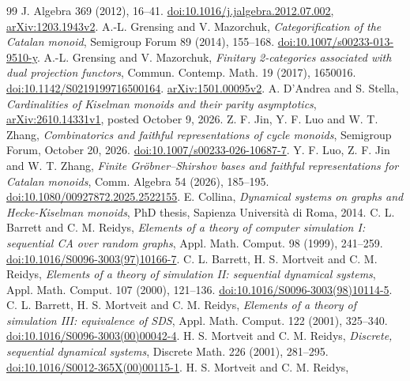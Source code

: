 \documentclass[11pt]{article}
\begin{document}
\begin{thebibliography}{99}
J. Algebra 369 (2012), 16--41.
\href{https://doi.org/10.1016/j.jalgebra.2012.07.002}{doi:10.1016/j.jalgebra.2012.07.002},
\href{https://arxiv.org/abs/1203.1943v2}{arXiv:1203.1943v2}.
 A.-L. Grensing and V. Mazorchuk,
\emph{Categorification of the Catalan monoid},
Semigroup Forum 89 (2014), 155--168.
\href{https://doi.org/10.1007/s00233-013-9510-y}{doi:10.1007/s00233-013-9510-y}.
 A.-L. Grensing and V. Mazorchuk,
\emph{Finitary 2-categories associated with dual projection functors},
Commun. Contemp. Math. 19 (2017), 1650016.
\href{https://doi.org/10.1142/S0219199716500164}{doi:10.1142/S0219199716500164}.
\href{https://arxiv.org/abs/1501.00095v2}{arXiv:1501.00095v2}.
 A. D'Andrea and S. Stella,
\emph{Cardinalities of Kiselman monoids and their parity asymptotics},
\href{https://arxiv.org/abs/2610.14331v1}{arXiv:2610.14331v1}, posted October 9, 2026.
 Z. F. Jin, Y. F. Luo and W. T. Zhang,
\emph{Combinatorics and faithful representations of cycle monoids},
Semigroup Forum, October 20, 2026.
\href{https://doi.org/10.1007/s00233-026-10687-7}{doi:10.1007/s00233-026-10687-7}.
 Y. F. Luo, Z. F. Jin and W. T. Zhang,
\emph{Finite Gr\"obner--Shirshov bases and faithful representations for Catalan monoids},
Comm. Algebra 54 (2026), 185--195.
\href{https://doi.org/10.1080/00927872.2025.2522155}{doi:10.1080/00927872.2025.2522155}.
 E. Collina,
\emph{Dynamical systems on graphs and Hecke-Kiselman monoids},
PhD thesis, Sapienza Universit\`a di Roma, 2014.
 C. L. Barrett and C. M. Reidys,
\emph{Elements of a theory of computer simulation I: sequential CA over random graphs},
Appl. Math. Comput. 98 (1999), 241--259.
\href{https://doi.org/10.1016/S0096-3003(97)10166-7}{doi:10.1016/S0096-3003(97)10166-7}.
 C. L. Barrett, H. S. Mortveit and C. M. Reidys,
\emph{Elements of a theory of simulation II: sequential dynamical systems},
Appl. Math. Comput. 107 (2000), 121--136.
\href{https://doi.org/10.1016/S0096-3003(98)10114-5}{doi:10.1016/S0096-3003(98)10114-5}.
 C. L. Barrett, H. S. Mortveit and C. M. Reidys,
\emph{Elements of a theory of simulation III: equivalence of SDS},
Appl. Math. Comput. 122 (2001), 325--340.
\href{https://doi.org/10.1016/S0096-3003(00)00042-4}{doi:10.1016/S0096-3003(00)00042-4}.
 H. S. Mortveit and C. M. Reidys,
\emph{Discrete, sequential dynamical systems},
Discrete Math. 226 (2001), 281--295.
\href{https://doi.org/10.1016/S0012-365X(00)00115-1}{doi:10.1016/S0012-365X(00)00115-1}.
 H. S. Mortveit and C. M. Reidys,

\end{thebibliography}
\end{document}
